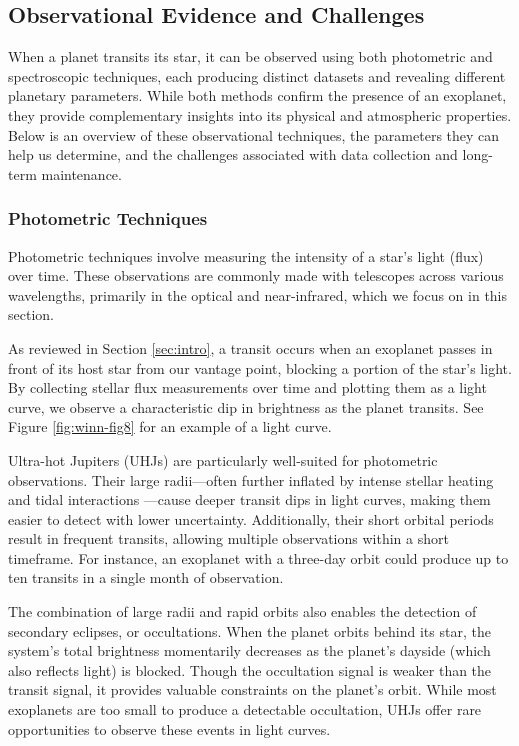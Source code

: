 \documentclass[oneside,12pt]{amsart}
\numberwithin{page}{section}
\begin{document}
\subsection{Observational Evidence and Challenges}\label{sec:obs}

When a planet transits its star, it can be observed using both photometric and spectroscopic techniques, each producing distinct datasets and revealing different planetary parameters. While both methods confirm the presence of an exoplanet, they provide complementary insights into its physical and atmospheric properties. Below is an overview of these observational techniques, the parameters they can help us determine, and the challenges associated with data collection and long-term maintenance.

\subsubsection{Photometric Techniques}\label{sec:obs-photo}

Photometric techniques involve measuring the intensity of a star’s light (flux) over time. These observations are commonly made with telescopes across various wavelengths, primarily in the optical and near-infrared, which we focus on in this section.

As reviewed in Section \ref{sec:intro}, a transit occurs when an exoplanet passes in front of its host star from our vantage point, blocking a portion of the star’s light. By collecting stellar flux measurements over time and plotting them as a light curve, we observe a characteristic dip in brightness as the planet transits. See Figure \ref{fig:winn-fig8} for an example of a light curve.

Ultra-hot Jupiters (UHJs) are particularly well-suited for photometric observations. Their large radii—often further inflated by intense stellar heating and tidal interactions \citep{ogilvie2014tidal}—cause deeper transit dips in light curves, making them easier to detect with lower uncertainty. Additionally, their short orbital periods result in frequent transits, allowing multiple observations within a short timeframe. For instance, an exoplanet with a three-day orbit could produce up to ten transits in a single month of observation.

The combination of large radii and rapid orbits also enables the detection of secondary eclipses, or occultations. When the planet orbits behind its star, the system’s total brightness momentarily decreases as the planet’s dayside (which also reflects light) is blocked. Though the occultation signal is weaker than the transit signal, it provides valuable constraints on the planet’s orbit. While most exoplanets are too small to produce a detectable occultation, UHJs offer rare opportunities to observe these events in light curves.
\end{document}
